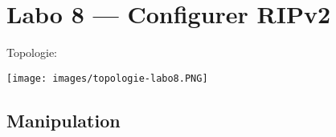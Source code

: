 \documentclass[a4paper]{article}
\begin{document}
\section{Labo 8 --- Configurer RIPv2}





Topologie:
\begin{center}
    \texttt{[image: images/topologie-labo8.PNG]}
\end{center}










\subsection{Manipulation}
\end{document}
